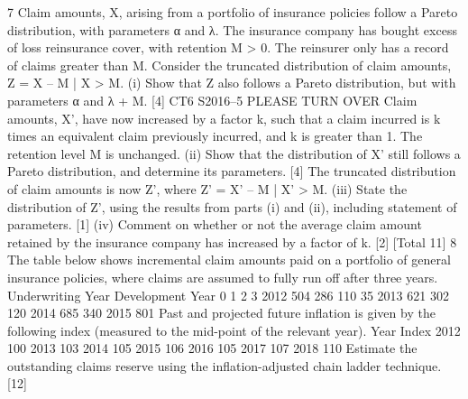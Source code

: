 7 Claim amounts, X, arising from a portfolio of insurance policies follow a Pareto
distribution, with parameters α and λ. The insurance company has bought excess of
loss reinsurance cover, with retention M > 0.
The reinsurer only has a record of claims greater than M. Consider the truncated
distribution of claim amounts, Z = X – M | X > M.
(i) Show that Z also follows a Pareto distribution, but with parameters α and
λ + M. [4]
CT6 S2016–5 PLEASE TURN OVER
Claim amounts, X’, have now increased by a factor k, such that a claim incurred is k
times an equivalent claim previously incurred, and k is greater than 1. The retention
level M is unchanged.
(ii) Show that the distribution of X’ still follows a Pareto distribution, and
determine its parameters. [4]
The truncated distribution of claim amounts is now Z’, where Z’ = X’ – M | X’ > M.
(iii) State the distribution of Z’, using the results from parts (i) and (ii), including
statement of parameters. [1]
(iv) Comment on whether or not the average claim amount retained by the
insurance company has increased by a factor of k. [2]
[Total 11]
8 The table below shows incremental claim amounts paid on a portfolio of general
insurance policies, where claims are assumed to fully run off after three years.
Underwriting
Year
Development Year
0 1 2 3
2012 504 286 110 35
2013 621 302 120
2014 685 340
2015 801
Past and projected future inflation is given by the following index (measured to the
                                                                     mid-point of the relevant year).
Year
Index
2012 100
2013 103
2014 105
2015 106
2016 105
2017 107
2018 110
Estimate the outstanding claims reserve using the inflation-adjusted chain ladder
technique. [12]

